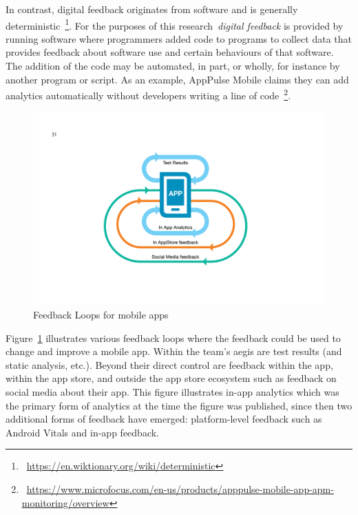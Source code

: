 In contrast, digital feedback originates from software and is generally deterministic~\footnote{~\url{https://en.wiktionary.org/wiki/deterministic}}. For the purposes of this research~\emph{digital feedback} is provided by running software where programmers added code to programs to collect data that provides feedback about software use and certain behaviours of that software. The addition of the code may be automated, in part, or wholly, for instance by another program or script. As an example, AppPulse Mobile claims they can add analytics automatically without developers writing a line of code~\footnote{~\url{https://www.microfocus.com/en-us/products/apppulse-mobile-app-apm-monitoring/overview}}.

\begin{figure}
    \centering
    \includegraphics[width=15cm]{images/mobile-analytics-playbook/Chart-07-FeedbackLoops.png}
    \caption{Feedback Loops for mobile apps~\citep{harty_aymer_playbook_2016}}
    \label{fig:map2015-feedback-loops-for-mobile-apps}
\end{figure}

Figure~\ref{fig:map2015-feedback-loops-for-mobile-apps} illustrates various feedback loops where the feedback could be used to change and improve a mobile app. Within the team's aegis are test results (and static analysis, etc.). Beyond their direct control are feedback within the app, within the app store, and outside the app store ecosystem such as feedback on social media about their app. This figure illustrates in-app analytics which was the primary form of analytics at the time the figure was published, since then two additional forms of feedback have emerged: platform-level feedback such as Android Vitals and in-app feedback.

